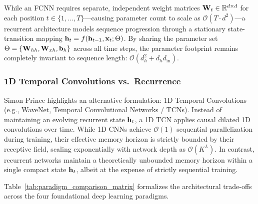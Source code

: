 \documentclass[../../main.tex]{subfiles}
\begin{document}
While an FCNN requires separate, independent weight matrices $\mathbf{W}_t \in \mathbb{R}^{d \times d}$ for each position $t \in \{1, \dots, T\}$---causing parameter count to scale as $\mathcal{O}(T \cdot d^2)$---a recurrent architecture models sequence progression through a stationary state-transition mapping $\mathbf{h}_t = f(\mathbf{h}_{t-1}, \mathbf{x}_t; \Theta)$. By sharing the parameter set $\Theta = \{\mathbf{W}_{hh}, \mathbf{W}_{xh}, \mathbf{b}_h\}$ across all time steps, the parameter footprint remains completely invariant to sequence length: $\mathcal{O}(d_h^2 + d_h d_{\text{in}})$.

\subsubsection{1D Temporal Convolutions vs.~Recurrence}
Simon Prince \cite{prince2023udl} highlights an alternative formulation: 1D Temporal Convolutions (e.g., WaveNet, Temporal Convolutional Networks / TCNs). Instead of maintaining an evolving recurrent state $\mathbf{h}_t$, a 1D TCN applies causal dilated 1D convolutions over time. While 1D CNNs achieve $\mathcal{O}(1)$ sequential parallelization during training, their effective memory horizon is strictly bounded by their receptive field, scaling exponentially with network depth as $\mathcal{O}(K^L)$. In contrast, recurrent networks maintain a theoretically unbounded memory horizon within a single compact state $\mathbf{h}_t$, albeit at the expense of strictly sequential training.

Table~\ref{tab:paradigm_comparison_matrix} formalizes the architectural trade-offs across the four foundational deep learning paradigms.
\end{document}
